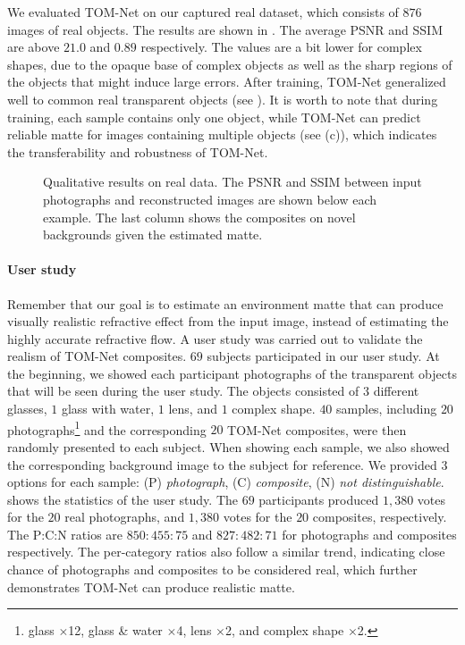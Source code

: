 We evaluated TOM-Net on our captured real dataset, which consists of $876$ images of real objects. The results are shown in . The average PSNR and SSIM are above $21.0$ and $0.89$ respectively. The values are a bit lower for complex shapes, due to the opaque base of complex objects as well as the sharp regions of the objects that might induce large errors. After training, TOM-Net generalized well to common real transparent objects (see ). It is worth to note that during training, each sample contains only one object, while TOM-Net can predict reliable matte for images containing multiple objects (see  (c)), which indicates the transferability and robustness of TOM-Net.

\begin{figure}[htbp] \centering
    
    \caption[Qualitative results on real data]{Qualitative results on real data. The PSNR and SSIM between input photographs and reconstructed images are shown below each example. The last column shows the composites on novel backgrounds given the estimated matte.} 
    \label{fig:real_qualitative}
\end{figure}

\paragraph{User study}
\label{par:User Study}
Remember that our goal is to estimate an environment matte that can produce visually realistic refractive effect from the input image, instead of estimating the highly accurate refractive flow.
A user study was carried out to validate the realism of TOM-Net composites. $69$ subjects participated in our user study. At the beginning, we showed each participant photographs of the transparent objects that will be seen during the user study. The objects consisted of $3$ different glasses, $1$ glass with water, $1$ lens, and $1$ complex shape. $40$ samples, including $20$ photographs\footnote{glass $\times$12, glass \& water $\times$4, lens $\times$2, and complex shape $\times$2.} and the corresponding $20$ TOM-Net composites, were then randomly presented to each subject. When showing each sample, we also showed the corresponding background image to the subject for reference. We provided $3$ options for each sample: (P) {\em photograph}, (C) {\em composite}, (N) {\em not distinguishable}.
 shows the statistics of the user study. The $69$ participants produced $1,380$ votes for the $20$ real photographs, and $1,380$ votes for the $20$ composites, respectively. The P:C:N ratios are $850:455:75$ and $827:482:71$ for photographs and composites respectively. The per-category ratios also follow a similar trend, indicating close chance of photographs and composites to be considered real, which further demonstrates TOM-Net can produce realistic matte. 

